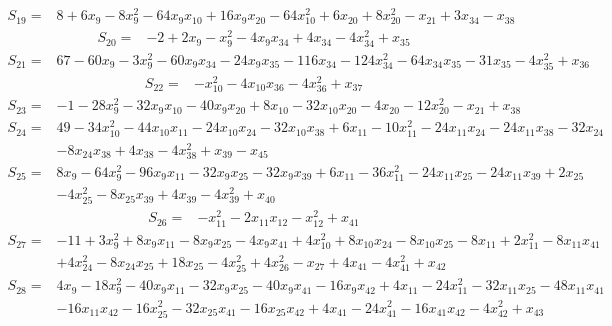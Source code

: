 \begin{align*}
S_{19}={}&8+6x_{9}-8x_{9}^{2}-64x_{9}x_{10}+16x_{9}x_{20}-64x_{10}^{2}+6x_{20}+8x_{20}^{2}-x_{21}+3x_{34}-x_{38}
\end{align*}
\begin{align*}
S_{20}={}&-2+2x_{9}-x_{9}^{2}-4x_{9}x_{34}+4x_{34}-4x_{34}^{2}+x_{35}
\end{align*}
\begin{align*}
S_{21}={}&67-60x_{9}-3x_{9}^{2}-60x_{9}x_{34}-24x_{9}x_{35}-116x_{34}-124x_{34}^{2}-64x_{34}x_{35}-31x_{35}-4x_{35}^{2}+x_{36}
\end{align*}
\begin{align*}
S_{22}={}&-x_{10}^{2}-4x_{10}x_{36}-4x_{36}^{2}+x_{37}
\end{align*}
\begin{align*}
S_{23}={}&-1-28x_{9}^{2}-32x_{9}x_{10}-40x_{9}x_{20}+8x_{10}-32x_{10}x_{20}-4x_{20}-12x_{20}^{2}-x_{21}+x_{38}
\end{align*}
\begin{align*}
S_{24}={}&49-34x_{10}^{2}-44x_{10}x_{11}-24x_{10}x_{24}-32x_{10}x_{38}+6x_{11}-10x_{11}^{2}-24x_{11}x_{24}-24x_{11}x_{38}-32x_{24}\\
{}&-8x_{24}x_{38}+4x_{38}-4x_{38}^{2}+x_{39}-x_{45}
\end{align*}
\begin{align*}
S_{25}={}&8x_{9}-64x_{9}^{2}-96x_{9}x_{11}-32x_{9}x_{25}-32x_{9}x_{39}+6x_{11}-36x_{11}^{2}-24x_{11}x_{25}-24x_{11}x_{39}+2x_{25}\\
{}&-4x_{25}^{2}-8x_{25}x_{39}+4x_{39}-4x_{39}^{2}+x_{40}
\end{align*}
\begin{align*}
S_{26}={}&-x_{11}^{2}-2x_{11}x_{12}-x_{12}^{2}+x_{41}
\end{align*}
\begin{align*}
S_{27}={}&-11+3x_{9}^{2}+8x_{9}x_{11}-8x_{9}x_{25}-4x_{9}x_{41}+4x_{10}^{2}+8x_{10}x_{24}-8x_{10}x_{25}-8x_{11}+2x_{11}^{2}-8x_{11}x_{41}\\
{}&+4x_{24}^{2}-8x_{24}x_{25}+18x_{25}-4x_{25}^{2}+4x_{26}^{2}-x_{27}+4x_{41}-4x_{41}^{2}+x_{42}
\end{align*}
\begin{align*}
S_{28}={}&4x_{9}-18x_{9}^{2}-40x_{9}x_{11}-32x_{9}x_{25}-40x_{9}x_{41}-16x_{9}x_{42}+4x_{11}-24x_{11}^{2}-32x_{11}x_{25}-48x_{11}x_{41}\\
{}&-16x_{11}x_{42}-16x_{25}^{2}-32x_{25}x_{41}-16x_{25}x_{42}+4x_{41}-24x_{41}^{2}-16x_{41}x_{42}-4x_{42}^{2}+x_{43}
\end{align*}
